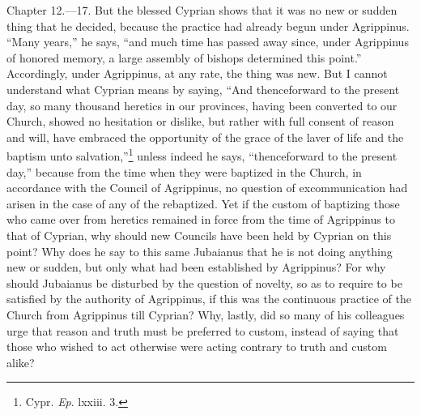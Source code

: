 Chapter 12.—17. But the blessed Cyprian shows that it was no new or sudden thing that he decided, because the practice had already begun under Agrippinus. ``Many years,'' he says, ``and much time has passed away since, under Agrippinus of honored memory, a large assembly of bishops determined this point.'' Accordingly, under Agrippinus, at any rate, the thing was new. But I cannot understand what Cyprian means by saying, ``And thenceforward to the present day, so many thousand heretics in our provinces, having been converted to our Church, showed no hesitation or dislike, but rather with full consent of reason and will, have embraced the opportunity of the grace of the laver of life and the baptism unto salvation,''\footnote{\par  Cypr. \emph{Ep}. lxxiii. 3.} unless indeed he says, ``thenceforward to the present day,'' because from the time when they were baptized in the Church, in accordance with the Council of Agrippinus, no question of excommunication had arisen in the case of any of the rebaptized. Yet if the custom of baptizing those who came over from heretics remained in force from the time of Agrippinus to that of Cyprian, why should new Councils have been held by Cyprian on this point? Why does he say to this same Jubaianus that he is not doing anything new or sudden, but only what had been established by Agrippinus? For why should Jubaianus be disturbed by the question of novelty, so as to require to be satisfied by the authority of Agrippinus, if this was the continuous practice of the Church from Agrippinus till Cyprian? Why, lastly, did so many of his colleagues urge that reason and truth must be preferred to custom, instead of saying that those who wished to act otherwise were acting contrary to truth and custom alike?


